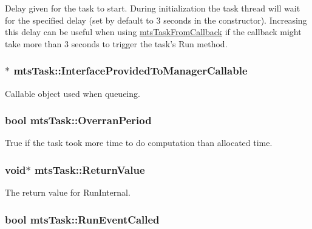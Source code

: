 Delay given for the task to start. During initialization the task thread will wait for the specified delay (set by default to 3 seconds in the constructor). Increasing this delay can be useful when using \hyperlink{classmts_task_from_callback}{mts\-Task\-From\-Callback} if the callback might take more than 3 seconds to trigger the task's Run method. \hypertarget{classmts_task_a044e5d67f206af2df17d7406860d4ec4}{
\subsubsection[{Interface\-Provided\-To\-Manager\-Callable}]{$\ast$ mts\-Task\-::\-Interface\-Provided\-To\-Manager\-Callable\hspace{0.3cm}{\ttfamily [protected]}}}\label{classmts_task_a044e5d67f206af2df17d7406860d4ec4}
Callable object used when queueing. \hypertarget{classmts_task_a974896a778a02b8928397213658b1c83}{
\subsubsection[{Overran\-Period}]{\setlength{\rightskip}{0pt plus 5cm}bool mts\-Task\-::\-Overran\-Period\hspace{0.3cm}{\ttfamily [protected]}}}\label{classmts_task_a974896a778a02b8928397213658b1c83}
True if the task took more time to do computation than allocated time. \hypertarget{classmts_task_a78bef07d3d9f446ee5d83724ada03d7e}{
\subsubsection[{Return\-Value}]{\setlength{\rightskip}{0pt plus 5cm}void$\ast$ mts\-Task\-::\-Return\-Value\hspace{0.3cm}{\ttfamily [protected]}}}\label{classmts_task_a78bef07d3d9f446ee5d83724ada03d7e}
The return value for Run\-Internal. \hypertarget{classmts_task_a274a28efd0acb799f30a25ca6a729956}{
\subsubsection[{Run\-Event\-Called}]{\setlength{\rightskip}{0pt plus 5cm}bool mts\-Task\-::\-Run\-Event\-Called\hspace{0.3cm}{\ttfamily [protected]}}}\label{classmts_task_a274a28efd0acb799f30a25ca6a729956}

